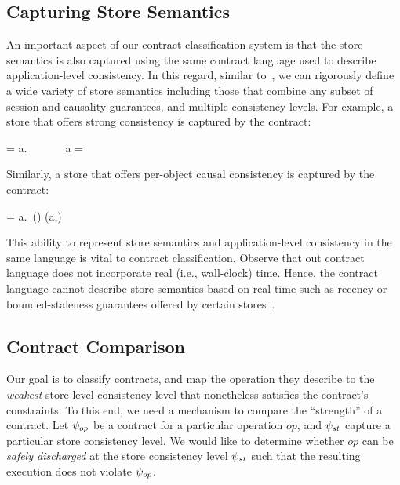 \subsection{Capturing Store Semantics}
\label{sec:store_sem}

An important aspect of our contract classification system is that the store
semantics is also captured using the same contract language used to describe
application-level consistency. In this regard, similar
to~\cite{Burckhardt2014}, we can rigorously define a wide variety of store
semantics including those that combine any subset of session and causality
guarantees, and multiple consistency levels. For example, a store that offers
strong consistency is captured by the contract:

\vspace{-1em}
\begin{smathpar}
\scc = \forall a.~ \Rightarrow {} ~\vee~  ~\vee~ a = \cureff
\end{smathpar}

\noindent Similarly, a store that offers per-object causal consistency is captured by the
contract:

\vspace{-1em}
\begin{smathpar}
\ccc = \forall a.~(\hboZ \cap \sameobjZ) (a,\cureff) \Rightarrow {}
\end{smathpar}

\noindent This ability to represent store semantics and application-level consistency in
the same language is vital to contract classification. Observe that out
contract language does not incorporate real (i.e., wall-clock) time. Hence, the
contract language cannot describe store semantics based on real time such as
recency or bounded-staleness guarantees offered by certain
stores~\cite{Pileus}.

\subsection{Contract Comparison}

Our goal is to classify contracts, and map the operation they describe to
the \emph{weakest} store-level consistency level that  nonetheless
satisfies the contract's constraints. To this end, we need a mechanism to 
compare the ``strength'' of a contract. Let $\psi_{op}$ be a contract for a
particular operation $op$, and $\psi_{st}$ capture a particular store
consistency level. We would like to determine whether $op$ can be
\emph{safely discharged} at the store consistency level $\psi_{st}$ such that
the resulting execution does not violate $\psi_{op}$.

